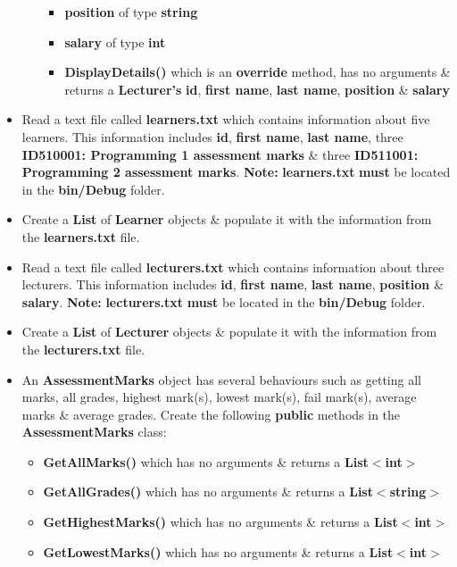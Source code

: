 \documentclass{article}
\begin{document}
\begin{itemize}
\begin{itemize}
\begin{itemize}
            \item \textbf{position} of type \textbf{string}
            \item \textbf{salary} of type \textbf{int}
            \item \textbf{DisplayDetails()} which is an \textbf{override} method, has no arguments \& returns a \textbf{Lecturer's} \textbf{id}, \textbf{first name}, \textbf{last name}, \textbf{position} \& \textbf{salary}
        \end{itemize}
    \end{itemize}
    \item Read a text file called \textbf{learners.txt} which contains information about five learners. This information includes \textbf{id}, \textbf{first name}, \textbf{last name}, three \textbf{ID510001: Programming 1 assessment marks} \& three \textbf{ID511001: Programming 2 assessment marks}. \textbf{Note:} \textbf{learners.txt} \textbf{must} be located in the \textbf{bin/Debug} folder.
    \item Create a \textbf{List} of \textbf{Learner} objects \& populate it with the information from the \textbf{learners.txt} file.
    \item Read a text file called \textbf{lecturers.txt} which contains information about three lecturers. This information includes \textbf{id}, \textbf{first name}, \textbf{last name}, \textbf{position} \& \textbf{salary}. \textbf{Note:} \textbf{lecturers.txt} \textbf{must} be located in the \textbf{bin/Debug} folder.
    \item Create a \textbf{List} of \textbf{Lecturer} objects \& populate it with the information from the \textbf{lecturers.txt} file.
    \item An \textbf{AssessmentMarks} object has several behaviours such as getting all marks, all grades, highest mark(s), lowest mark(s), fail mark(s), average marks \& average grades. Create the following \textbf{public} methods in the \textbf{AssessmentMarks} class:
    \begin{itemize}
        \item \textbf{GetAllMarks()} which has no arguments \& returns a \textbf{List$<$int$>$} 
        \item \textbf{GetAllGrades()} which has no arguments \& returns a \textbf{List$<$string$>$}
        \item \textbf{GetHighestMarks()} which has no arguments \& returns a \textbf{List$<$int$>$}
        \item \textbf{GetLowestMarks()} which has no arguments \& returns a \textbf{List$<$int$>$}

\end{itemize}
\end{itemize}
\end{document}
